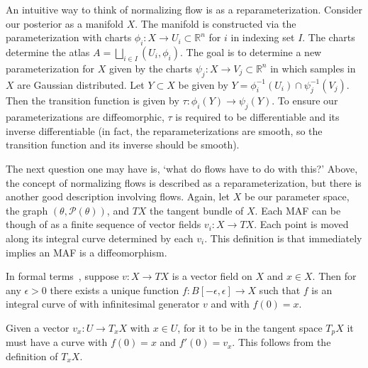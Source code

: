 An intuitive way to think of normalizing flow is as a reparameterization. Consider our posterior as a manifold $X$. The manifold is constructed via the parameterization with charts $\phi_i:X\rightarrow U_i \subset \mathbb{R}^n$ for $i$ in indexing set $I$. 
The charts determine the atlas $A = \bigsqcup\limits_{i\in I} (U_i,\phi_i)$. 
The goal is to determine a new parameterization for $X$ given by the charts $\psi_j:X\rightarrow V_j \subset \mathbb{R}^n$ in which samples in $X$ are Gaussian distributed. 
Let $Y \subset X$ be given by $Y = \phi_i^{-1}(U_i) \cap \psi_j^{-1}(V_j)$. 
Then the transition function is given by $\tau:\phi_i(Y)\rightarrow\psi_j(Y)$. 
To ensure our parameterizations are diffeomorphic, $\tau$ is required to be differentiable and its inverse differentiable 
(in fact, the reparameterizations are smooth, so the transition function and its inverse should be smooth).

The next question one may have is, `what do flows have to do with this?' Above, the concept of normalizing flows is described as a reparameterization, but there is another good description involving flows. Again, let $X$ be our parameter space, the graph $(\theta,\mathcal{P}(\theta))$, and $TX$ the tangent bundle of $X$. Each MAF can be though of as a finite sequence of vector fields $v_i:X \rightarrow TX$. Each point is moved along its integral curve determined by each $v_i$. This definition is that immediately implies an MAF is a diffeomorphism. 

In formal terms~\cite{john_lee_smooth_nodate}, suppose $v:X \rightarrow TX$ is a vector field on $X$ and $x \in X$. Then for any $\epsilon>0$ there exists a unique function $f:B[-\epsilon,\epsilon]\rightarrow X$ such that $f$ is an integral curve of with infinitesimal generator $v$ and with $f(0) = x$.  

Given a vector $v_x:U\rightarrow T_x X$ with $x\in U$, for it to be in the tangent space $T_pX$ it must have a curve with $f(0)=x$ and $f'(0)=v_x$. This follows from the definition of $T_xX$.


